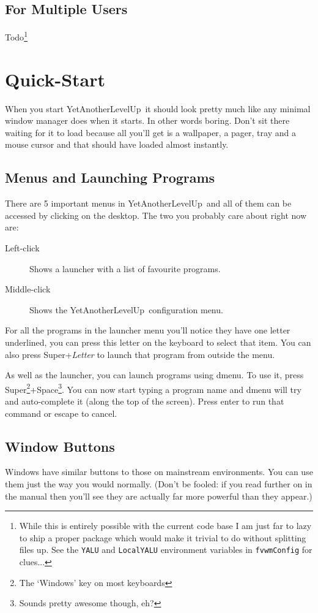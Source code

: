 \documentclass[a4paper,11pt]{article}
\newcommand{\yalu}{YetAnotherLevelUp}
\begin{document}
		\subsection{For Multiple Users}
			Todo\footnote{
				While this is entirely possible with the current code base I am just far
				to lazy to ship a proper package which would make it trivial to do
				without splitting files up. See the \texttt{YALU} and \texttt{LocalYALU}
				environment variables in \texttt{fvwmConfig} for clues...
			}
	
	\section{Quick-Start}
		When you start \yalu\ it should look pretty much like any minimal window
		manager does when it starts. In other words boring. Don't sit there waiting
		for it to load because all you'll get is a wallpaper, a pager, tray and a
		mouse cursor and that should have loaded almost instantly.
		
		\subsection{Menus and Launching Programs}
		There are 5 important menus in \yalu\ and all of them can be accessed by
		clicking on the desktop. The two you probably care about right now are:
		\begin{description}
			\item[Left-click] Shows a launcher with a list of favourite programs.
			\item[Middle-click] Shows the \yalu\ configuration menu.
		\end{description}
		
		For all the programs in the launcher menu you'll notice they have one letter
		underlined, you can press this letter on the keyboard
		to select that item. You can also press Super+\emph{Letter} to launch that
		program from outside the menu.
		
		As well as the launcher, you can launch programs using dmenu. To use it,
		press Super\footnote{The `Windows' key on most
		keyboards}+Space\footnote{Sounds pretty awesome though, eh?}. You can now
		start typing a program name and dmenu will try and auto-complete it (along
		the top of the screen). Press enter to run that command or escape to cancel.
		
		\subsection{Window Buttons}
		Windows have similar buttons to those on mainstream environments. You can
		use them just the way you would normally. (Don't be fooled: if you
		read further on in the manual then you'll see they are actually far more
		powerful than they appear.)
		
\end{document}
